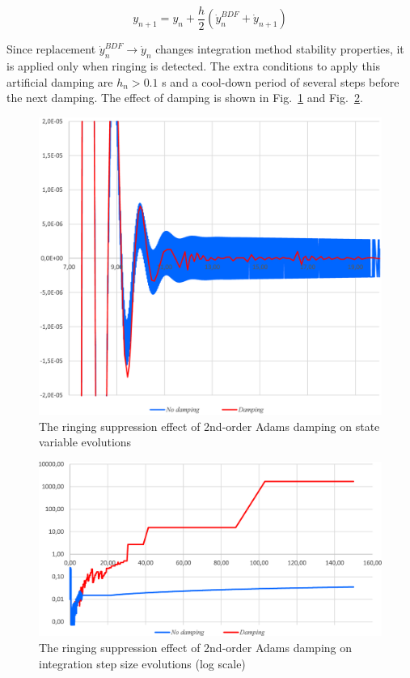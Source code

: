 \documentclass[lettersize,journal]{IEEEtran}
\begin{document}
\begin{equation}
	\label{eqn_modadams}
	y_{n+1}=y_n+\frac{h}{2}\left(\dot{y}_n^{BDF}+\dot{y}_{n+1} \right)
\end{equation}

Since replacement \(\dot{y}_n^{BDF} \rightarrow \dot{y}_n\) changes integration method stability properties, it is applied only when ringing is detected. The extra conditions to apply this artificial damping are \(h_n>0.1\) s and a cool-down period of several steps before the next damping. The effect of damping is shown in Fig.~\ref{fig_adams_damping_variable} and Fig.~\ref{fig_adams_damping_step}.

\begin{figure}[htbp]
	\centering
	\includegraphics[width=0.8\columnwidth]{adams_damping_variable.eps}
	\caption{The ringing suppression effect of 2nd-order Adams damping on state variable evolutions }
	\label{fig_adams_damping_variable}
\end{figure}

\begin{figure}[htbp]
	\centering
	\includegraphics[width=0.8\columnwidth]{adams_damping_step.eps}
	\caption{The ringing suppression effect of 2nd-order Adams damping on integration step size evolutions (log scale) }
	\label{fig_adams_damping_step}
\end{figure}
\end{document}
